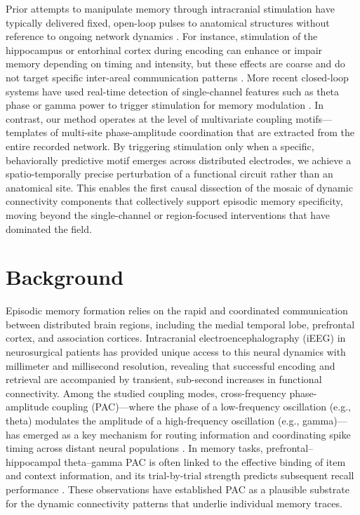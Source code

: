 \documentclass{article}
\begin{document}
Prior attempts to manipulate memory through intracranial stimulation have typically delivered fixed, open-loop pulses to anatomical structures without reference to ongoing network dynamics \cite{Rizzuto2003, Suthana2012, Kim2016}. For instance, stimulation of the hippocampus or entorhinal cortex during encoding can enhance or impair memory depending on timing and intensity, but these effects are coarse and do not target specific inter-areal communication patterns \cite{Ezzyat2018, Mohan2020}. More recent closed-loop systems have used real-time detection of single-channel features such as theta phase or gamma power to trigger stimulation for memory modulation \cite{Ramaroson2023, Kragel2022}. In contrast, our method operates at the level of multivariate coupling motifs—templates of multi-site phase-amplitude coordination that are extracted from the entire recorded network. By triggering stimulation only when a specific, behaviorally predictive motif emerges across distributed electrodes, we achieve a spatio-temporally precise perturbation of a functional circuit rather than an anatomical site. This enables the first causal dissection of the mosaic of dynamic connectivity components that collectively support episodic memory specificity, moving beyond the single-channel or region-focused interventions that have dominated the field.

\section{Background}

Episodic memory formation relies on the rapid and coordinated communication between distributed brain regions, including the medial temporal lobe, prefrontal cortex, and association cortices.  Intracranial electroencephalography (iEEG) in neurosurgical patients has provided unique access to this neural dynamics with millimeter and millisecond resolution, revealing that successful encoding and retrieval are accompanied by transient, sub-second increases in functional connectivity.  Among the studied coupling modes, cross-frequency phase-amplitude coupling (PAC)—where the phase of a low-frequency oscillation (e.g., theta) modulates the amplitude of a high-frequency oscillation (e.g., gamma)—has emerged as a key mechanism for routing information and coordinating spike timing across distant neural populations \cite{Canolty2006, Buzsaki2010}.  In memory tasks, prefrontal–hippocampal theta–gamma PAC is often linked to the effective binding of item and context information, and its trial-by-trial strength predicts subsequent recall performance \cite{Axmacher2006, Lega2012}.  These observations have established PAC as a plausible substrate for the dynamic connectivity patterns that underlie individual memory traces.
\end{document}
